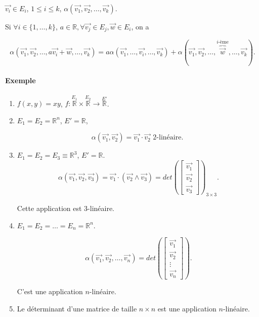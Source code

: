 \documentclass[french]{article}
\begin{document}
$\overrightarrow{ v_i } \in E_i $, $1 \leq i \leq k$, $\alpha(\overrightarrow{ v_1 }, \overrightarrow{ v_2 }, \dots, \overrightarrow{ v_k })$.

Si $\forall i \in \{ 1, \dots, k \}$, $a \in \mathbb{R}, \forall \overrightarrow{ v_j } \in E_j, \overrightarrow{ w } \in E_i $, on a

\[
\alpha(\overrightarrow{ v_1 }, \overrightarrow{ v_2 }, \dots, a \overrightarrow{ v_i }+ \overrightarrow{ w }, \dots, \overrightarrow{ v_k }) = a \alpha(\overrightarrow{ v_1 }, \dots, \overrightarrow{ v_i }, \dots, \overrightarrow{ v_k })+ \alpha(\overrightarrow{ v_1 }, \overrightarrow{ v_2 }, \dots, \overbrace{\overrightarrow{ w } }^{i\text{-ème}}, \dots, \overrightarrow{ v_k }).
\]

\paragraph{Exemple}

\begin{enumerate}
  \item $f(x,y) = xy$, $f : \stackrel{E_1}{\mathbb{R}} \times \stackrel{E_2}{\mathbb{R}} \to \stackrel{E'}{\mathbb{R}}$.
  \item $E_1 = E_2 = \mathbb{R}^n$, $E' = \mathbb{R}$,

  \[
  \alpha(\overrightarrow{ v_1 }, \overrightarrow{ v_2 } ) = \overrightarrow{ v_1 }\cdot \overrightarrow{ v_2 } \text{ 2-linéaire. }
  \]

  \item $E_1 = E_2 = E_3 \equiv \mathbb{R}^3$, $E' = \mathbb{R}$.
  \[
  \alpha(\overrightarrow{ v_1 }, \overrightarrow{ v_2 }, \overrightarrow{ v_3 }) = \overrightarrow{ v_1 } \cdot (\overrightarrow{ v_2 } \wedge \overrightarrow{ v_3 }  ) = det \left( \left[\begin{matrix}
  \overrightarrow{ v_1 } \\
  \overrightarrow{ v_2 }  \\
  \overrightarrow{ v_3 }
  \end{matrix}\right]\right)  _{3 \times 3}.
  \]

  Cette application est 3-linéaire.

  \item $E_1 = E_2 = \dots = E_n = \mathbb{R}^n$.

  \[
  \alpha(\overrightarrow{ v_1 }, \overrightarrow{ v_2 }, \dots, \overrightarrow{ v_n } ) = det \left(\left[\begin{matrix}
  \overrightarrow{ v_1 } \\
  \overrightarrow{ v_2 } \\
  \vdots \\
  \overrightarrow{ v_n }
  \end{matrix}\right]\right).
  \]

  C'est une application $n$-linéaire.

  \item Le déterminant d'une matrice de taille $n \times n$ est une application $n$-linéaire.
\end{enumerate}
\end{document}
